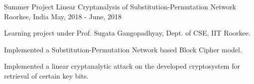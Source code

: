 \begin{cventries}
  \cventry
    {Summer Project} %
    {Linear Cryptanalysis of Substitution-Permutation Network} %
    {Roorkee, India} %
    {May, 2018 - June, 2018} %
    {
      \begin{cvitems} %
        \item {Learning project under Prof. Sugata Gangopadhyay, Dept. of CSE, IIT Roorkee.}
        \item {Implemented a Substitution-Permutation Network based Block Cipher model.}
        \item {Implemented a linear cryptanalytic attack on the developed cryptosystem for retrieval of certain key bits.}
      \end{cvitems}
    }


\end{cventries}
